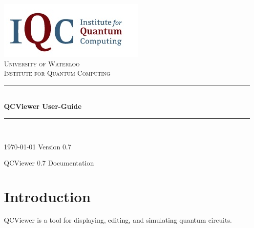 \documentclass[10pt]{article}
\theoremstyle{definition}
\newcommand{\HRule}{\rule{\linewidth}{0.5mm}}
\begin{document}
\begin{titlepage}

\begin{center}


\includegraphics{Figures/Logo.png}\\[1cm]    

\textsc{\LARGE University of Waterloo}\\[1.5cm]

\textsc{\Large Institute for Quantum Computing}\\[0.5cm]


\HRule \\[0.4cm]
{ \huge \bfseries QCViewer User-Guide}\\[0.4cm]

\HRule \\[1.5cm]

\vfill

{\large \today}
{\large Version 0.7}

\end{center}

\end{titlepage}

\tableofcontents
\newpage

    \begin{flushright}
    QCViewer 0.7 Documentation
    \end{flushright}

\section{Introduction} \label{sec:Introduction}

QCViewer is a tool for displaying, editing, and simulating quantum circuits. 
\end{document}
